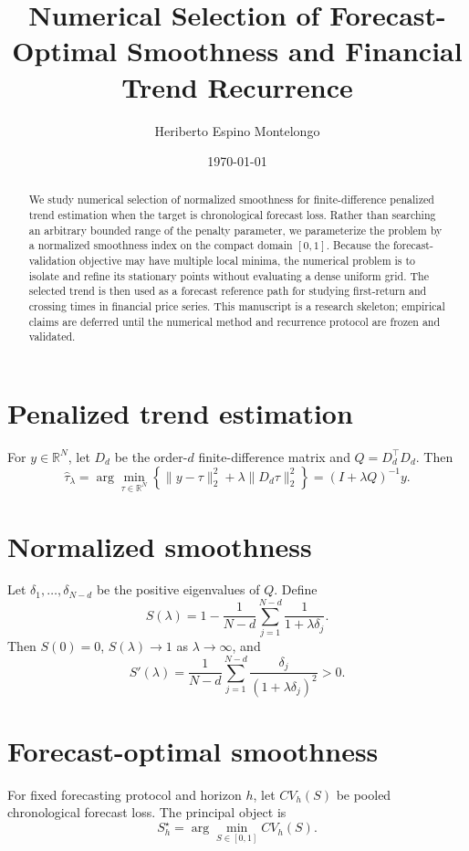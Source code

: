 \documentclass[11pt]{article}
\title{Numerical Selection of Forecast-Optimal Smoothness and Financial Trend Recurrence}
\author{Heriberto Espino Montelongo}
\date{\today}
\newcommand{\R}{\mathbb{R}}
\begin{document}
\maketitle

\begin{abstract}
We study numerical selection of normalized smoothness for finite-difference
penalized trend estimation when the target is chronological forecast loss.
Rather than searching an arbitrary bounded range of the penalty parameter, we
parameterize the problem by a normalized smoothness index on the compact domain
$[0,1]$. Because the forecast-validation objective may have multiple local
minima, the numerical problem is to isolate and refine its stationary points
without evaluating a dense uniform grid. The selected trend is then used as a
forecast reference path for studying first-return and crossing times in
financial price series. This manuscript is a research skeleton; empirical
claims are deferred until the numerical method and recurrence protocol are
frozen and validated.
\end{abstract}

\section{Penalized trend estimation}

For $y\in\R^N$, let $D_d$ be the order-$d$ finite-difference matrix and
$Q=D_d^\top D_d$. Then
\[
\widehat\tau_\lambda
=
\arg\min_{\tau\in\R^N}
\left\{
\|y-\tau\|_2^2+\lambda\|D_d\tau\|_2^2
\right\}
=
(I+\lambda Q)^{-1}y.
\]

\section{Normalized smoothness}

Let $\delta_1,\ldots,\delta_{N-d}$ be the positive eigenvalues of $Q$.
Define
\[
S(\lambda)
=
1-
\frac{1}{N-d}
\sum_{j=1}^{N-d}
\frac{1}{1+\lambda\delta_j}.
\]
Then $S(0)=0$, $S(\lambda)\to1$ as $\lambda\to\infty$, and
\[
S'(\lambda)
=
\frac{1}{N-d}
\sum_{j=1}^{N-d}
\frac{\delta_j}{(1+\lambda\delta_j)^2}
>0.
\]

\section{Forecast-optimal smoothness}

For fixed forecasting protocol and horizon $h$, let $CV_h(S)$ be pooled
chronological forecast loss. The principal object is
\[
\boxed{
S_h^\star=\arg\min_{S\in[0,1]}CV_h(S).
}
\]
\end{document}
